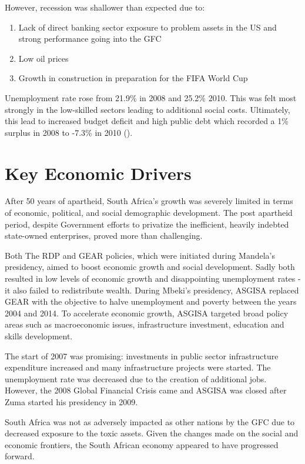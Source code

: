 \documentclass{elsarticle}
\begin{document}
However, recession was shallower than expected due to:
\begin{enumerate}
    \item Lack of direct banking sector exposure to problem assets in the US and strong performance going into the GFC
    \item Low oil prices
    \item Growth in construction in preparation for the FIFA World Cup
\end{enumerate}

Unemployment rate rose from 21.9\% in 2008 and 25.2\% 2010. This was felt most strongly in the low-skilled sectors leading to additional social costs. Ultimately, this lead to increased budget deficit and high public debt which recorded a 1\% surplus in 2008 to -7.3\% in 2010 (\cite{Gordhan2010}). 

\section{Key Economic Drivers}
After 50 years of apartheid, South Africa's growth was severely limited in terms of economic, political, and social demographic development. The post apartheid period, despite Government efforts to privatize the inefficient, heavily indebted state-owned enterprises, proved more than challenging.

Both The RDP and GEAR policies, which were initiated during Mandela’s presidency, aimed to boost economic growth and social development. Sadly both resulted in low levels of economic growth and disappointing unemployment rates - it also failed to redistribute wealth. During Mbeki’s presidency, ASGISA replaced GEAR with the objective to halve unemployment and poverty between the years 2004 and 2014. To accelerate economic growth, ASGISA targeted broad policy areas such as macroeconomic issues, infrastructure investment, education and skills development. 

The start of 2007 was promising: investments in public sector infrastructure expenditure increased and many infrastructure projects were started. The unemployment rate was decreased due to the creation of additional jobs. However, the 2008 Global Financial Crisis came and ASGISA was closed after Zuma started his presidency in 2009. 

South Africa was not as adversely impacted as other nations by the GFC due to decreased exposure to the toxic assets. Given the changes made on the social and economic frontiers, the South African economy appeared to have progressed forward.
\end{document}
